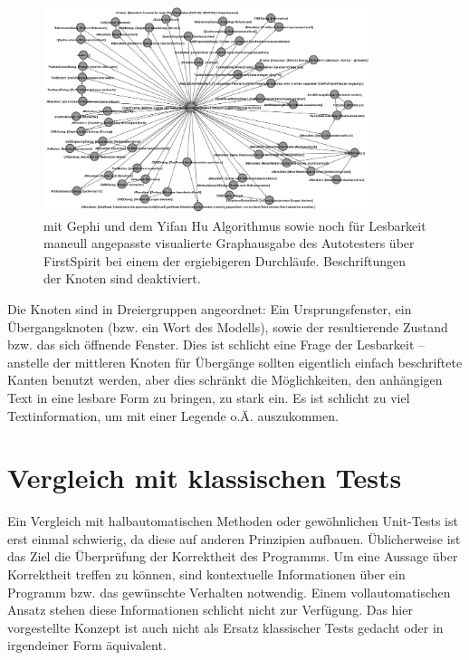 \begin{figure}
	\centering
	\includegraphics[width=0.85\textwidth]{bilder/model_freespirit.png}
	\caption{mit Gephi und dem Yifan Hu Algorithmus \cite{hu2005efficient}
    sowie noch für Lesbarkeit maneull angepasste visualierte Graphausgabe 
	des Autotesters über FirstSpirit bei einem der ergiebigeren Durchläufe.
	Beschriftungen der Knoten sind deaktiviert.}
	\label{fig:model_freespirit_06.10.2015}
\end{figure}



Die Knoten sind in Dreiergruppen angeordnet: Ein Ursprungsfenster, ein Übergangsknoten
(bzw. ein Wort des Modells), sowie der resultierende Zustand bzw. das sich öffnende Fenster.
Dies ist schlicht eine Frage der Lesbarkeit -- anstelle der mittleren Knoten für Übergänge sollten
eigentlich einfach beschriftete Kanten benutzt werden, aber dies schränkt die Möglichkeiten,
den anhängigen Text in eine lesbare Form zu bringen, zu stark ein. Es ist schlicht zu viel
Textinformation, um mit einer Legende o.Ä. auszukommen.


\section{Vergleich mit klassischen Tests}\label{section:testcomparisonclassic}

Ein Vergleich mit halbautomatischen Methoden oder gewöhnlichen Unit-Tests
ist erst einmal schwierig, da diese auf anderen Prinzipien aufbauen.
Üblicherweise ist das Ziel die Überprüfung der Korrektheit des Programms.
Um eine Aussage über Korrektheit treffen zu können, sind kontextuelle
Informationen über ein Programm bzw. das gewünschte Verhalten notwendig.
Einem vollautomatischen Ansatz stehen diese Informationen schlicht nicht
zur Verfügung. Das hier vorgestellte Konzept ist auch nicht als Ersatz 
klassischer Tests gedacht oder in irgendeiner Form äquivalent.

